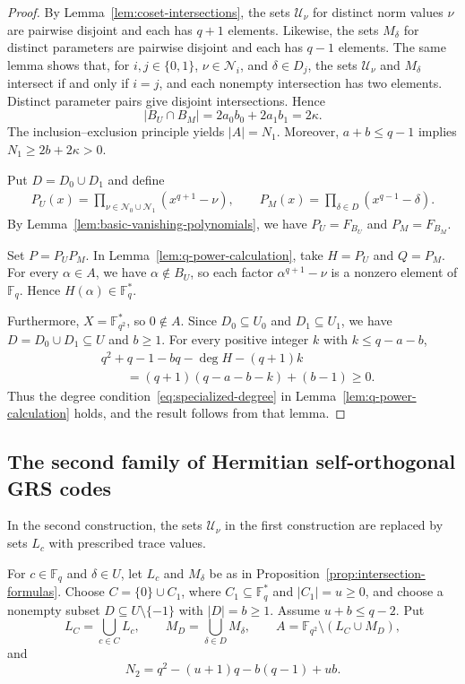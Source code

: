 \documentclass[preprint,12pt,a4paper]{elsarticle}
\begin{document}
\begin{proof}
By Lemma~\ref{lem:coset-intersections}, the sets $\mathcal U_\nu$ for distinct norm values $\nu$ are pairwise disjoint and each has $q+1$ elements. Likewise, the sets $M_\delta$ for distinct parameters are pairwise disjoint and each has $q-1$ elements. The same lemma shows that, for $i,j\in\{0,1\}$, $\nu\in\mathcal N_i$, and $\delta\in D_j$, the sets $\mathcal U_\nu$ and $M_\delta$ intersect if and only if $i=j$, and each nonempty intersection has two elements. Distinct parameter pairs give disjoint intersections. Hence
\[
 |B_U\cap B_M|=2a_0b_0+2a_1b_1=2\kappa.
\]
The inclusion--exclusion principle yields $|A|=N_1$. Moreover, $a+b\le q-1$ implies $N_1\ge2b+2\kappa>0$.

Put $D=D_0\cup D_1$ and define
\[
\begin{aligned}
 P_U(x)=\prod_{\nu\in\mathcal N_0\cup\mathcal N_1}
 (x^{q+1}-\nu),
 \qquad
 P_M(x)=\prod_{\delta\in D}(x^{q-1}-\delta).
\end{aligned}
\]
By Lemma~\ref{lem:basic-vanishing-polynomials}, we have $P_U=F_{B_U}$ and $P_M=F_{B_M}$.

Set $P=P_UP_M$. In Lemma~\ref{lem:q-power-calculation}, take $H=P_U$ and $Q=P_M$. For every $\alpha\in A$, we have $\alpha\notin B_U$, so each factor $\alpha^{q+1}-\nu$ is a nonzero element of $\mathbb F_q$. Hence $H(\alpha)\in\mathbb F_q^{*}$.

Furthermore, $X=\mathbb F_{q^2}^{*}$, so $0\notin A$. Since $D_0\subseteq U_0$ and $D_1\subseteq U_1$, we have $D=D_0\cup D_1\subseteq U$ and $b\ge1$.
For every positive integer $k$ with $k\le q-a-b$,
\[
\begin{aligned}
 &q^2+q-1-bq-\deg H-(q+1)k\\
 &\qquad=(q+1)(q-a-b-k)+(b-1)\ge0.
\end{aligned}
\]
Thus the degree condition~\eqref{eq:specialized-degree} in Lemma~\ref{lem:q-power-calculation} holds, and the result follows from that lemma.
\end{proof}

\subsection{The second family of Hermitian self-orthogonal GRS codes}

In the second construction, the sets $\mathcal U_\nu$ in the first construction are replaced by sets $L_c$ with prescribed trace values.

For $c\in\mathbb F_q$ and $\delta\in U$, let $L_c$ and $M_\delta$ be as in Proposition~\ref{prop:intersection-formulas}. Choose $C=\{0\}\cup C_1$, where $C_1\subseteq\mathbb F_q^{*}$ and $|C_1|=u\ge0$, and choose a nonempty subset $D\subseteq U\setminus\{-1\}$ with $|D|=b\ge1$. Assume $u+b\le q-2$. Put
\[
 L_C=\bigcup_{c\in C}L_c,
 \qquad
 M_D=\bigcup_{\delta\in D}M_\delta,
 \qquad
 A=\mathbb F_{q^2}\setminus(L_C\cup M_D),
\]
and
\[
 N_2=q^2-(u+1)q-b(q-1)+ub.
\]
\end{document}
